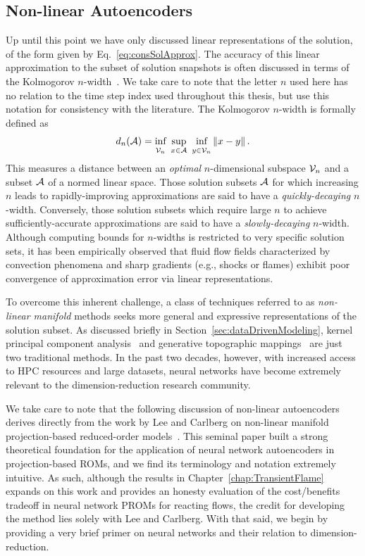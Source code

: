 \subsection{Non-linear Autoencoders}\label{subsec:nonlinManifold}

Up until this point we have only discussed linear representations of the solution, of the form given by Eq.~\ref{eq:consSolApprox}. The accuracy of this linear approximation to the subset of solution snapshots is often discussed in terms of the Kolmogorov $n$-width~\cite{Pinkus1985}. We take care to note that the letter $n$ used here has no relation to the time step index used throughout this thesis, but use this notation for consistency with the literature. The Kolmogorov $n$-width is formally defined as
%
\begin{equation}\label{eq:nwidth}
    d_n(\mathcal{A}) = \underset{\mathcal{V}_n}{\vphantom{sup}\text{inf}} \enspace \underset{x \in \mathcal{A}}{\text{sup}} \enspace \underset{y \in \mathcal{V}_n}{\vphantom{sup}\text{inf}} \left\Vert x - y \right\Vert.
\end{equation}
%
This measures a distance between an \textit{optimal} $n$-dimensional subspace $\mathcal{V}_n$ and a subset $\mathcal{A}$ of a normed linear space. Those solution subsets $\mathcal{A}$ for which increasing $n$ leads to rapidly-improving approximations are said to have a \textit{quickly-decaying} $n$-width. Conversely, those solution subsets which require large $n$ to achieve sufficiently-accurate approximations are said to have a \textit{slowly-decaying} $n$-width. Although computing bounds for $n$-widths is restricted to very specific solution sets, it has been empirically observed that fluid flow fields characterized by convection phenomena and sharp gradients (e.g., shocks or flames) exhibit poor convergence of approximation error via linear representations.

To overcome this inherent challenge, a class of techniques referred to as \textit{non-linear manifold} methods seeks more general and expressive representations of the solution subset. As discussed briefly in Section~\ref{sec:dataDrivenModeling}, kernel principal component analysis~\cite{kernelPCA} and generative topographic mappings~\cite{Bishop1997} are just two traditional methods. In the past two decades, however, with increased access to HPC resources and large datasets, neural networks have become extremely relevant to the dimension-reduction research community.

We take care to note that the following discussion of non-linear autoencoders derives directly from the work by Lee and Carlberg on non-linear manifold projection-based reduced-order models~\cite{Lee2020}. This seminal paper built a strong theoretical foundation for the application of neural network autoencoders in projection-based ROMs, and we find its terminology and notation extremely intuitive. As such, although the results in Chapter~\ref{chap:TransientFlame} expands on this work and provides an honesty evaluation of the cost/benefits tradeoff in neural network PROMs for reacting flows, the credit for developing the method lies solely with Lee and Carlberg. With that said, we begin by providing a very brief primer on neural networks and their relation to dimension-reduction.


